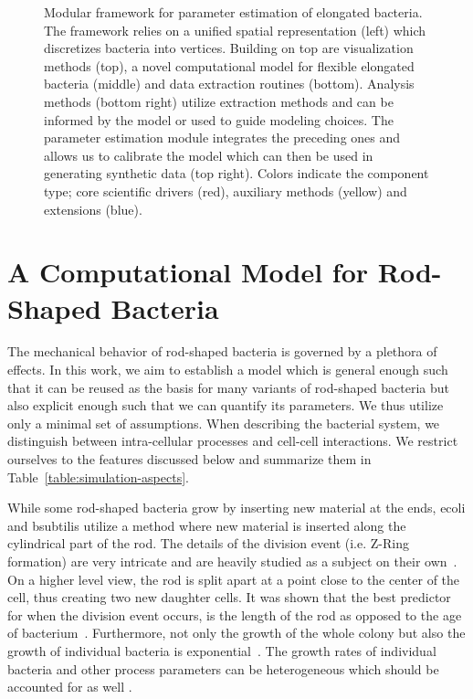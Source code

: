 \begin{figure}[H]
    \centering
    \caption{
        Modular framework for parameter estimation of elongated bacteria.
        The framework relies on a unified spatial representation (left) which discretizes
        bacteria into vertices.
        Building on top are visualization methods (top), a novel computational model for flexible
        elongated bacteria (middle) and data extraction routines (bottom).
        Analysis methods (bottom right) utilize extraction methods and can be informed by the model
        or used to guide modeling choices.
        The parameter estimation module integrates the preceding ones and allows us to calibrate the
        model which can then be used in generating synthetic data (top right).
        Colors indicate the component type; core scientific drivers (red), auxiliary
        methods (yellow)
        and extensions (blue).
    }
    \label{fig:flowchart-project-structure}
\end{figure}

\section{A Computational Model for Rod-Shaped Bacteria}
\label{sec:computational-model}

The mechanical behavior of rod-shaped bacteria is governed by a plethora of effects.
In this work, we aim to establish a model which is general enough such that it can be reused as the
basis for many variants of rod-shaped bacteria but also explicit enough such that we can quantify
its parameters.
We thus utilize only a minimal set of assumptions.
When describing the bacterial system, we distinguish between intra-cellular processes and cell-cell
interactions.
We restrict ourselves to the features discussed below and summarize them in
Table~\ref{table:simulation-aspects}.

While some rod-shaped bacteria grow by inserting new material at the ends, \ac{ecoli} and
\ac{bsubtilis} utilize a method where new material is inserted along the cylindrical part of
the rod. The details of the division event (i.e. Z-Ring formation) are very intricate and
are heavily
studied as a subject on their own~\cite{Harry2001}.
On a higher level view, the rod is split apart at a point close to the center of the cell, thus
creating two new daughter cells.
It was shown that the best predictor for when the division event occurs, is the length of the rod as
opposed to the age of bacterium~\cite{Robert2014}.
Furthermore, not only the growth of the whole colony but also the growth of individual bacteria is
exponential~\cite{Amir2014,Takeuchi2005}.
The growth rates of individual bacteria and other process parameters can be heterogeneous which
should be accounted for as well \cite{Koutsoumanis2013}.

